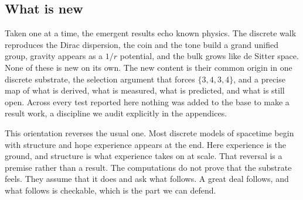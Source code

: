 \subsection{What is new}

Taken one at a time, the emergent results echo known physics. The discrete walk reproduces the Dirac dispersion,
the coin and the tone build a grand unified group, gravity appears as a $1/r$ potential, and the bulk grows like
de Sitter space. None of these is new on its own. The new content is their common origin in one discrete
substrate, the selection argument that forces $\{3,4,3,4\}$, and a precise map of what is derived, what is
measured, what is predicted, and what is still open. Across every test reported here nothing was added to the
base to make a result work, a discipline we audit explicitly in the appendices.

This orientation reverses the usual one. Most discrete models of spacetime begin with structure and hope
experience appears at the end. Here experience is the ground, and structure is what experience takes on at scale.
That reversal is a premise rather than a result. The computations do not prove that the substrate feels. They
assume that it does and ask what follows. A great deal follows, and what follows is checkable, which is the part
we can defend.

